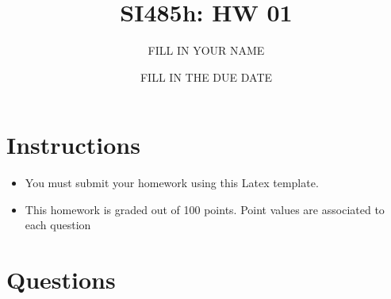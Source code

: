 \documentclass{article}[9pt]
\title{SI485h: HW 01}
\date{FILL IN THE DUE DATE}
\author{FILL IN YOUR NAME}
\begin{document}
\maketitle
\section*{Instructions}

\begin{itemize}
\item You must submit your homework using this Latex template.
  
\item This homework is graded out of 100 points. Point values are associated to each question
\end{itemize}

\section*{Questions}
\end{document}
